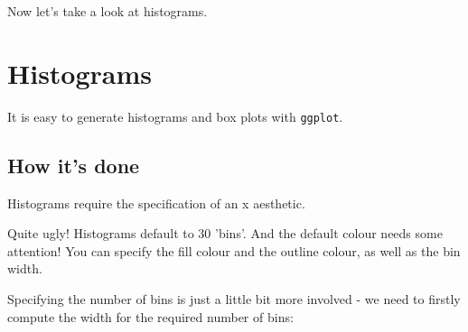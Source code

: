 \documentclass[titlepage]{book}\usepackage{knitr}
\begin{document}
\begin{knitrout}
\color{fgcolor}\begin{kframe}
\begin{alltt}
 \hlkwb{<-} \hlstd{(}  \hlstd{(} \hlstd{=}  
 \hlkwb{<-}  \hlopt{+} \hlstd{(} \hlstd{=} \hlstd{)}
\end{alltt}
\end{kframe}
\end{knitrout}
Now let's take a look at histograms.

\section{Histograms} 

It is easy to generate histograms and box plots with \texttt{ggplot}.

\subsection{How it's done}
Histograms require the specification of an x aesthetic.

\begin{knitrout}
\color{fgcolor}\begin{kframe}
\begin{alltt}
 \hlkwb{<-} \hlstd{(}  \hlstd{(} 
 \hlkwb{<-}  \hlopt{+} \hlstd{()}
\end{alltt}
\end{kframe}
\end{knitrout}
Quite ugly!  Histograms default to 30 'bins'. And the default colour needs some attention!
You can specify the fill colour and the outline colour, as well as the bin width.

\begin{knitrout}
\color{fgcolor}\begin{kframe}
\begin{alltt}
 \hlkwb{<-} \hlstd{(}  \hlstd{(} 
 \hlkwb{<-}  \hlopt{+} \hlstd{(} \hlstd{=} \hlstd{,}  \hlstd{=} \hlstd{,}  \hlstd{=} \hlstd{)}
\end{alltt}
\end{kframe}
\end{knitrout}
Specifying the number of bins is just a little bit more involved -  we need to firstly compute the width for the required number of bins:
\end{document}
